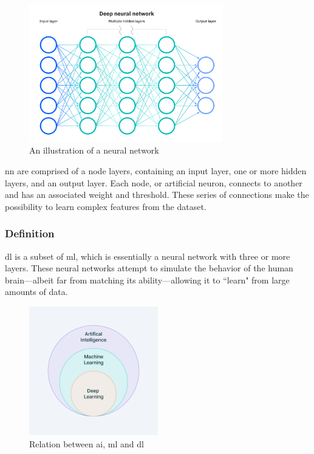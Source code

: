 \begin{figure}[H]
	\centering
	\includegraphics[width=0.75\textwidth]{Figures/NeuralNetwork.png}
	\caption{An illustration of a neural network}
\end{figure}
\FloatBarrier

\acrshort{nn} are comprised of a node layers, containing an input layer, one or more hidden layers, and an output layer. Each node, or artificial neuron, connects to another and has an associated weight and threshold. These series of connections make the possibility to learn complex features from the dataset.

\subsubsection{Definition}
\acrfull{dl} is a subset of \acrfull{ml}, which is essentially a neural network with three or more layers. These neural networks attempt to simulate the behavior of the human brain—albeit far from matching its ability—allowing it to ``learn" from large amounts of data. 

\begin{figure}[H]
	\centering
	\includegraphics[width=0.5\textwidth]{Figures/AIHierarchy.png}
	\caption{Relation between \acrshort{ai}, \acrshort{ml} and \acrshort{dl}}
\end{figure}
\FloatBarrier

